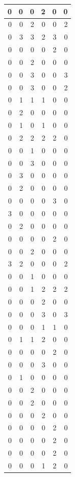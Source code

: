 \documentclass[
  12pt,
]{krantz}
\begin{document}
\begin{tabular}{r|r|r|r|r|r}
\hline
0 & 0 & 0 & 2 & 0 & 0\\
\hline
0 & 0 & 2 & 0 & 0 & 2\\
\hline
0 & 3 & 3 & 2 & 3 & 0\\
\hline
0 & 0 & 0 & 0 & 2 & 0\\
\hline
0 & 0 & 2 & 0 & 0 & 0\\
\hline
0 & 0 & 3 & 0 & 0 & 3\\
\hline
0 & 0 & 3 & 0 & 0 & 2\\
\hline
0 & 1 & 1 & 1 & 0 & 0\\
\hline
0 & 2 & 0 & 0 & 0 & 0\\
\hline
0 & 1 & 0 & 1 & 0 & 0\\
\hline
0 & 2 & 2 & 2 & 2 & 0\\
\hline
0 & 0 & 1 & 0 & 0 & 0\\
\hline
0 & 0 & 3 & 0 & 0 & 0\\
\hline
0 & 3 & 0 & 0 & 0 & 0\\
\hline
0 & 2 & 0 & 0 & 0 & 0\\
\hline
0 & 0 & 0 & 0 & 3 & 0\\
\hline
3 & 0 & 0 & 0 & 0 & 0\\
\hline
0 & 2 & 0 & 0 & 0 & 0\\
\hline
0 & 0 & 0 & 0 & 2 & 0\\
\hline
0 & 0 & 2 & 0 & 0 & 0\\
\hline
3 & 2 & 0 & 0 & 0 & 2\\
\hline
0 & 0 & 1 & 0 & 0 & 0\\
\hline
0 & 0 & 1 & 2 & 2 & 2\\
\hline
0 & 0 & 0 & 2 & 0 & 0\\
\hline
0 & 0 & 0 & 3 & 0 & 3\\
\hline
0 & 0 & 0 & 1 & 1 & 0\\
\hline
0 & 1 & 1 & 2 & 0 & 0\\
\hline
0 & 0 & 0 & 0 & 2 & 0\\
\hline
0 & 0 & 0 & 3 & 0 & 0\\
\hline
0 & 1 & 0 & 0 & 0 & 0\\
\hline
0 & 0 & 2 & 0 & 0 & 0\\
\hline
0 & 0 & 2 & 0 & 0 & 0\\
\hline
0 & 0 & 0 & 2 & 0 & 0\\
\hline
0 & 0 & 0 & 0 & 2 & 0\\
\hline
0 & 0 & 0 & 0 & 2 & 0\\
\hline
0 & 0 & 0 & 0 & 2 & 0\\
\hline
0 & 0 & 0 & 1 & 2 & 0\\

\end{tabular}
\end{document}
